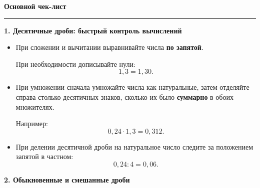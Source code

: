 \documentclass[a4paper,12pt]{article}
\newcommand{\sectiontitle}[1]{%
    \vspace{0.4em}
    {\Large\bfseries\textcolor{darkaccent}{#1}}\par
    \vspace{0.2em}
    \noindent
    \textcolor{accent}{\rule{\linewidth}{0.7pt}}\par
    \vspace{0.35em}
}
\newcommand{\subhead}[1]{%
    \vspace{0.25em}
    {\large\bfseries\textcolor{darkaccent}{#1}}\par
    \vspace{0.1em}
}
\begin{document}

\sectiontitle{Основной чек-лист}


\subhead{1. Десятичные дроби: быстрый контроль вычислений}

\begin{itemize}

\item
При сложении и вычитании выравнивайте числа
\textbf{по запятой}.

При необходимости дописывайте нули:
\[
1{,}3=1{,}30.
\]

\item
При умножении сначала умножайте числа как натуральные,
затем отделяйте справа столько десятичных знаков,
сколько их было \textbf{суммарно} в обоих множителях.

Например:
\[
0{,}24\cdot1{,}3=0{,}312.
\]

\item
При делении десятичной дроби на натуральное число
следите за положением запятой в частном:
\[
0{,}24:4=0{,}06.
\]

\end{itemize}


\subhead{2. Обыкновенные и смешанные дроби}
\end{document}
